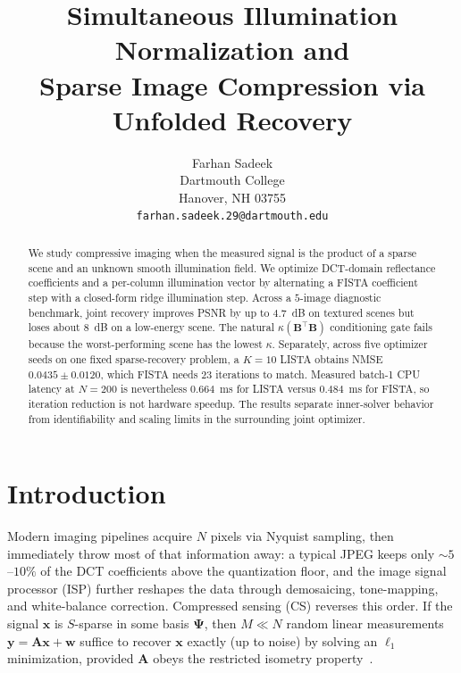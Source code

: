 \documentclass{article}
\title{Simultaneous Illumination Normalization and\\ Sparse Image Compression via Unfolded Recovery}
\author{%
  Farhan Sadeek \\
  Dartmouth College\\
  Hanover, NH 03755 \\
  \texttt{farhan.sadeek.29@dartmouth.edu} \\
}
\begin{document}
\maketitle

\begin{abstract}
  We study compressive imaging when the measured signal is the product of a sparse scene and an unknown smooth illumination field. We optimize DCT-domain reflectance coefficients and a per-column illumination vector by alternating a FISTA coefficient step with a closed-form ridge illumination step. Across a $5$-image diagnostic benchmark, joint recovery improves PSNR by up to $4.7$~dB on textured scenes but loses about $8$~dB on a low-energy scene. The natural $\kappa(\boldsymbol{B}^\top\boldsymbol{B})$ conditioning gate fails because the worst-performing scene has the lowest $\kappa$. Separately, across five optimizer seeds on one fixed sparse-recovery problem, a $K{=}10$ LISTA obtains NMSE $0.0435\pm0.0120$, which FISTA needs $23$ iterations to match. Measured batch-1 CPU latency at $N{=}200$ is nevertheless $0.664$~ms for LISTA versus $0.484$~ms for FISTA, so iteration reduction is not hardware speedup. The results separate inner-solver behavior from identifiability and scaling limits in the surrounding joint optimizer.
\end{abstract}

\section{Introduction}
\label{sec:intro}

Modern imaging pipelines acquire $N$ pixels via Nyquist sampling, then immediately throw most of that information away: a typical JPEG keeps only $\sim 5$--$10\%$ of the DCT coefficients above the quantization floor, and the image signal processor (ISP) further reshapes the data through demosaicing, tone-mapping, and white-balance correction. Compressed sensing (CS) reverses this order. If the signal $\boldsymbol{x}$ is $S$-sparse in some basis $\boldsymbol{\Psi}$, then $M \ll N$ random linear measurements $\boldsymbol{y} = \boldsymbol{A}\boldsymbol{x} + \boldsymbol{w}$ suffice to recover $\boldsymbol{x}$ exactly (up to noise) by solving an $\ell_1$ minimization, provided $\boldsymbol{A}$ obeys the restricted isometry property~\citep{candes2006stable,donoho2006compressed}.
\end{document}

